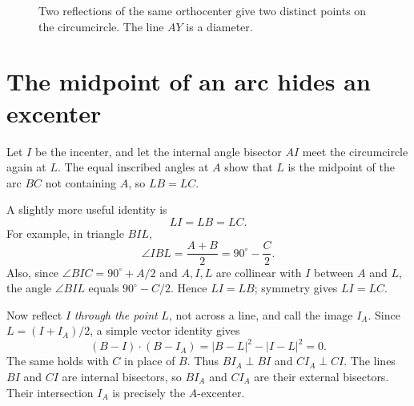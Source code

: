 \begin{figure}[H]
\centering
{}
\caption{Two reflections of the same orthocenter give two distinct points on the circumcircle. The line \(AY\) is a diameter.}
\end{figure}

\section{The midpoint of an arc hides an excenter}

Let \(I\) be the incenter, and let the internal angle bisector \(AI\) meet the circumcircle again at \(L\). The equal inscribed angles at \(A\) show that \(L\) is the midpoint of the arc \(BC\) not containing \(A\), so \(LB=LC\).

A slightly more useful identity is
\[
 \boxed{LI=LB=LC.}
\]
For example, in triangle \(BIL\),
\[
 \angle IBL=\frac{A+B}{2}=90^\circ-\frac C2.
\]
Also, since \(\angle BIC=90^\circ+A/2\) and \(A,I,L\) are collinear with \(I\) between \(A\) and \(L\), the angle \(\angle BIL\) equals \(90^\circ-C/2\). Hence \(LI=LB\); symmetry gives \(LI=LC\).

Now reflect \(I\) \emph{through the point} \(L\), not across a line, and call the image \(I_A\). Since \(L=(I+I_A)/2\), a simple vector identity gives
\[
 (B-I)\cdot(B-I_A)
   =|B-L|^2-|I-L|^2=0.
\]
The same holds with \(C\) in place of \(B\). Thus \(BI_A\perp BI\) and \(CI_A\perp CI\). The lines \(BI\) and \(CI\) are internal bisectors, so \(BI_A\) and \(CI_A\) are their external bisectors. Their intersection \(I_A\) is precisely the \(A\)-excenter.

